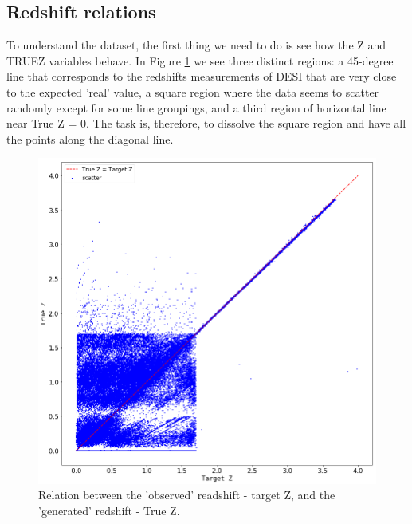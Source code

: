 \subsection{Redshift relations}
To understand the dataset, the first thing we need to do is see how the Z and TRUEZ variables behave. In Figure \ref{fig:z-truez} we see three distinct regions: a 45-degree line that corresponds to the redshifts measurements of DESI that are very close to the expected 'real' value, a square region where the data seems to scatter randomly except for some line groupings, and a third region of horizontal line near True Z = 0. The task is, therefore, to dissolve the square region and have all the points along the diagonal line.   
\begin{figure}[h!]
	\centering
	\includegraphics[width=1.0\linewidth]{TeX_files/Imagenes/z-truez}
	\caption{Relation between the 'observed' readshift - target Z, and the 'generated' redshift - True Z.}
	\label{fig:z-truez}
\end{figure}

